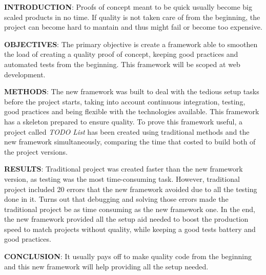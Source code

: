 \textbf{INTRODUCTION}: Proofs of concept meant to be quick usually become big scaled products in no time. If quality is not taken care of from the beginning, the project can become hard to mantain and thus might fail or become too expensive.

\textbf{OBJECTIVES}: The primary objective is create a framework able to smoothen the load of creating a quality proof of concept, keeping good practices and automated tests from the beginning. This framework will be scoped at web development.

\textbf{METHODS}: The new framework was built to deal with the tedious setup tasks before the project starts, taking into account continuous integration, testing, good practices and being flexible with the technologies available. This framework has a skeleton prepared to ensure quality. To prove this framework useful, a project called \textit{TODO List} has been created using traditional methods and the new framework simultaneously, comparing the time that costed to build both of the project versions.

\textbf{RESULTS}: Traditional project was created faster than the new framework version, as testing was the most time-consuming task. However, traditional project included 20 errors that the new framework avoided due to all the testing done in it. Turns out that debugging and solving those errors made the traditional project be as time consuming as the new framework one. In the end, the new framework provided all the setup aid needed to boost the production speed to match projects without quality, while keeping a good tests battery and good practices.

\textbf{CONCLUSION}: It usually pays off to make quality code from the beginning and this new framework will help providing all the setup needed.
